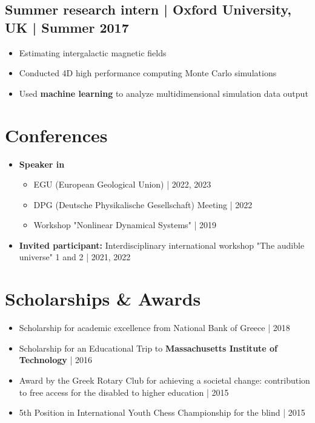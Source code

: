 \documentclass[11pt,a4paper]{article}
\begin{document}
\begin{multicols}{2}
		\subsection{Summer research intern | Oxford University, UK | Summer 2017}
		\begin{itemize}
			\item Estimating intergalactic magnetic fields
			\item Conducted 4D high performance computing Monte Carlo simulations
			\item Used \textbf{machine learning} to analyze multidimensional simulation data output
		\end{itemize}
		
	\end{multicols}
	
	\section{Conferences}
	\begin{itemize}
		\item \textbf{Speaker in}
		\begin{itemize}
			\item EGU (European Geological Union) | 2022, 2023
			\item DPG (Deutsche Physikalische Gesellschaft) Meeting | 2022
			\item Workshop "Nonlinear Dynamical Systems" | 2019
		\end{itemize}
		\item \textbf{Invited participant:} Interdisciplinary international workshop "The audible universe" 1 and 2 | 2021, 2022
	\end{itemize}
	
	\section{Scholarships \& Awards}
	\begin{itemize}
		\item Scholarship for academic excellence from National Bank of Greece | 2018
		\item Scholarship for an Educational Trip to \textbf{Massachusetts Institute of Technology} | 2016
		\item Award by the Greek Rotary Club for achieving a societal change: contribution to free access for the disabled to higher education | 2015
		\item 5th Position in International Youth Chess Championship for the blind | 2015
	\end{itemize}
	
\end{document}
